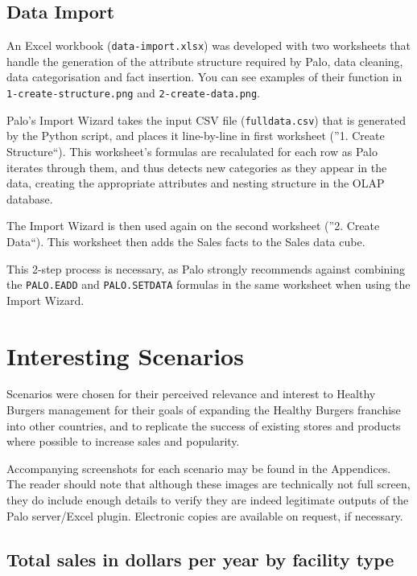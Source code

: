 \documentclass[12pt, a4paper]{article}
\begin{document}
\subsection*{Data Import}

An Excel workbook (\texttt{data-import.xlsx}) was developed with two worksheets that handle the generation of the attribute structure required by Palo, data cleaning, data categorisation and fact insertion. You can see examples of their function in \texttt{1-create-structure.png} and \texttt{2-create-data.png}.

Palo's Import Wizard takes the input CSV file (\texttt{fulldata.csv}) that is generated by the Python script, and places it line-by-line in first worksheet (''1. Create Structure``).
This worksheet's formulas are recalulated for each row as Palo iterates through them, and thus detects new categories as they appear in the data, creating the appropriate attributes and nesting structure in the OLAP database.

The Import Wizard is then used again on the second worksheet (''2. Create Data``). This worksheet then adds the Sales facts to the Sales data cube.

This 2-step process is necessary, as Palo strongly recommends against combining the \texttt{PALO.EADD} and \texttt{PALO.SETDATA} formulas in the same worksheet when using the Import Wizard.

\section*{Interesting Scenarios}

Scenarios were chosen for their perceived relevance and interest to Healthy Burgers management for their goals of expanding the Healthy Burgers franchise into other countries, and to replicate the success of existing stores and products where possible to increase sales and popularity.

Accompanying screenshots for each scenario may be found in the Appendices. The reader should note that although these images are technically not full screen, they do include enough details to verify they are indeed legitimate outputs of the Palo server/Excel plugin. Electronic copies are available on request, if necessary.

\subsection*{Total sales in dollars per year by facility type}
\end{document}
